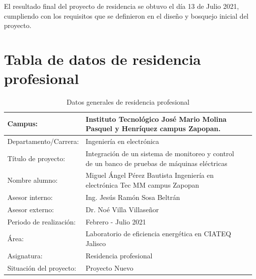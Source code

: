 \documentclass[12pt,titlepage]{article}
\begin{document}
El resultado final del proyecto de residencia se obtuvo el día 13 de Julio 2021,  cumpliendo con los requisitos que se definieron en el diseño y bosquejo inicial del proyecto. \\
 
\newpage
{}
{
  \hypersetup{hidelinks}
\tableofcontents %
} 
\newpage
\section{Tabla de datos de residencia profesional}
\begin{table}[!h]

\begin{center}
\begin{tabular}{ | m{15em} | m{22em}| m{35em} | } 
\hline
Campus: & \vspace{5mm} Instituto Tecnológico José Mario Molina Pasquel y Henríquez campus Zapopan.  \\[3.5mm]
\hline
Departamento/Carrera: & \vspace{5mm} Ingeniería en electrónica  \\ [3.5mm]
\hline
Título de proyecto: & \vspace{5mm} Integración de un sistema de monitoreo y control de un banco de pruebas de máquinas eléctricas \\[2.5mm]
\hline
Nombre alumno: & \vspace{5mm} Miguel Ángel Pérez Bautista \newline 16011804 \newline Ingeniería en electrónica \newline Tec MM campus Zapopan \\ [3.5mm]
\hline
Asesor interno: & \vspace{5mm} Ing. Jesús Ramón Sosa Beltrán \newline   \\ [3.5mm]
\hline
Asesor externo: & \vspace{5mm} Dr. Noé Villa Villaseñor  \\ [3.5mm]
\hline
Periodo de realización: & \vspace{5mm} Febrero  - Julio 2021  \\  [3.5mm]
\hline
Área: & \vspace{5mm} Laboratorio de eficiencia energética en CIATEQ Jalisco  \\  [3.5mm]
\hline
Asignatura: & \vspace{5mm} Residencia profesional  \\  [3.5mm]
\hline
Situación del proyecto: & \vspace{5mm}  Proyecto Nuevo  \\  [3.5mm]
\hline
\end{tabular}
\end{center}
\caption{Datos generales de residencia profesional}
\label{tabla:1}
\end{table}
\newpage
\end{document}
